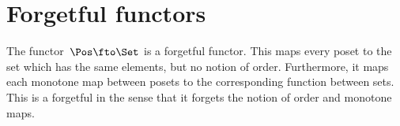 \section{Forgetful functors}


\begin{example}
    The functor~$\Pos \fto \Set$ is a forgetful functor.
    This  maps every poset to the set which has the same elements, but no notion of order.
    Furthermore, it maps each monotone map between posets to the corresponding function between sets.
    This is a forgetful  in the sense that it forgets the notion of order and monotone maps.
\end{example}

